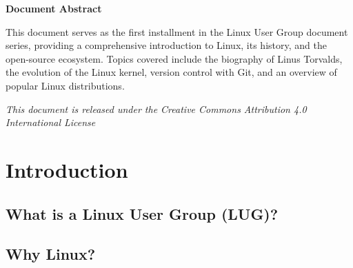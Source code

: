 


	
	\maketitle
	
	
	\begin{center}
		\colorbox{luglight}{
			\begin{minipage}{0.8\textwidth}
				\centering
				\vspace{0.5cm}
				\Large\textbf{Document Abstract}
				\vspace{0.3cm}
				
				\normalsize
				This document serves as the first installment in the Linux User Group document series, providing a comprehensive introduction to Linux, its history, and the open-source ecosystem. Topics covered include the biography of Linus Torvalds, the evolution of the Linux kernel, version control with Git, and an overview of popular Linux distributions.
				\vspace{0.5cm}
			\end{minipage}
		}
	\end{center}
	
	\vfill
	
	\begin{center}
		\small\textit{This document is released under the Creative Commons Attribution 4.0 International License}
	\end{center}
	
	\newpage
	
	\tableofcontents
	\newpage
	
	
	\section{Introduction}
	\subsection{What is a Linux User Group (LUG)?}
	\subsection{Why Linux?}
	
